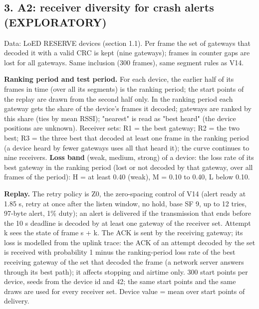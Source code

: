 \subsection*{3. A2: receiver diversity for crash alerts (EXPLORATORY)}

Data: LoED RESERVE devices (section 1.1). Per frame the set of gateways that decoded it with a valid CRC is kept (nine gateways); frames in counter gaps are lost for all gateways. Same inclusion (300 frames), same segment rules as V14.

\textbf{Ranking period and test period.} For each device, the earlier half of its frames in time (over all its segments) is the ranking period; the start points of the replay are drawn from the second half only. In the ranking period each gateway gets the share of the device's frames it decoded; gateways are ranked by this share (ties by mean RSSI); "nearest" is read as "best heard" (the device positions are unknown). Receiver sets: R1 = the best gateway; R2 = the two best; R3 = the three best that decoded at least one frame in the ranking period (a device heard by fewer gateways uses all that heard it); the curve continues to nine receivers. \textbf{Loss band} (weak, medium, strong) of a device: the loss rate of its best gateway in the ranking period (lost or not decoded by that gateway, over all frames of the period): H = at least 0.40 (weak), M = 0.10 to 0.40, L below 0.10.

\textbf{Replay.} The retry policy is Z0, the zero-spacing control of V14 (alert ready at 1.85 s, retry at once after the listen window, no hold, base SF 9, up to 12 tries, 97-byte alert, 1\% duty); an alert is delivered if the transmission that ends before the 10 s deadline is decoded by at least one gateway of the receiver set. Attempt k sees the state of frame s + k. The ACK is sent by the receiving gateway; its loss is modelled from the uplink trace: the ACK of an attempt decoded by the set is received with probability 1 minus the ranking-period loss rate of the best receiving gateway of the set that decoded the frame (a network server answers through its best path); it affects stopping and airtime only. 300 start points per device, seeds from the device id and 42; the same start points and the same draws are used for every receiver set. Device value = mean over start points of delivery.

